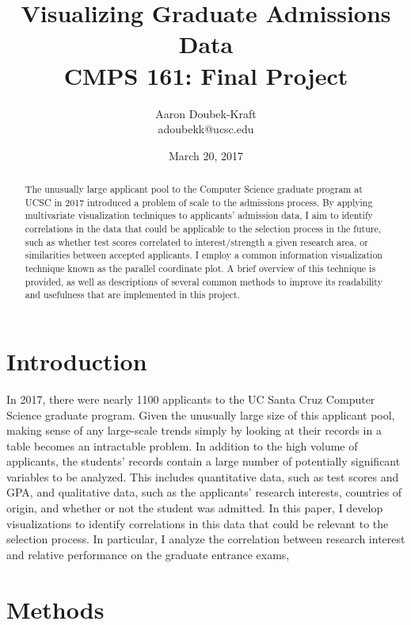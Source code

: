 \documentclass[]{article}
\title{Visualizing Graduate Admissions Data \\ CMPS 161: Final Project}
\author{Aaron Doubek-Kraft \\ adoubekk@ucsc.edu}
\date{March 20, 2017}
\begin{document}
\begin{titlepage}

	\maketitle

	\begin{abstract}
		The unusually large applicant pool to the Computer Science graduate program at UCSC in 2017 introduced a problem of scale to the admissions process. By applying multivariate visualization techniques to applicants' admission data, I aim to identify correlations in the data that could be applicable to the selection process in the future, such as whether test scores correlated to interest/strength a given research area, or similarities between accepted applicants. I employ a common information visualization technique known as the parallel coordinate plot. A brief overview of this technique is provided, as well as descriptions of several common methods to improve its readability and usefulness that are implemented in this project.
	\end{abstract}

\end{titlepage}

\section{Introduction}

	\par In 2017, there were nearly 1100 applicants to the UC Santa Cruz Computer Science graduate program. Given the unusually large size of this applicant pool, making sense of any large-scale trends simply by looking at their records in a table becomes an intractable problem. In addition to the high volume of applicants, the students' records contain a large number of potentially significant variables to be analyzed. This includes quantitative data, such as test scores and GPA, and qualitative data, such as the applicants' research interests, countries of origin, and whether or not the student was admitted.  In this paper, I develop visualizations to identify correlations in this data that could be relevant to the selection process. In particular, I analyze the correlation between research interest and relative performance on the graduate entrance exams, 

\section{Methods}
\end{document}
